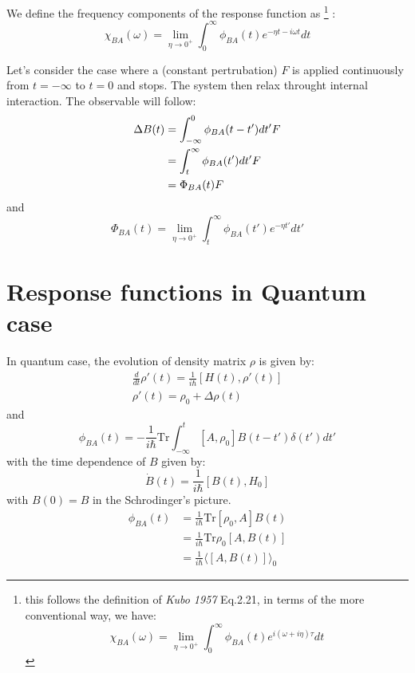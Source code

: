 \documentclass{article}
\begin{document}
We define the frequency components of the response function as
\footnote{this follows the definition of \emph{Kubo 1957} Eq.2.21, in terms
of the more conventional way, we have:
\begin{equation}
    \chi_{BA}(\omega) = \lim_{\eta\to 0^+} \int_{0}^{\infty} \phi_{BA} (t) e^{i(\omega+i\eta)\tau} dt
\end{equation}
}
:
\begin{equation}
    \chi_{BA}(\omega) = \lim_{\eta\to 0^+} \int_{0}^{\infty} \phi_{BA} (t) e^{-\eta t-i\omega t} dt
\end{equation}

Let's consider the case where a (constant pertrubation) $F$ is applied continuously from $t = -\infty$ to 
$t = 0$ and stops. The system then relax throught internal interaction. The observable will
follow:
\begin{align}
    \Delta B(t) &= \int_{-\infty}^{0} \phi_{BA} (t-t') dt' F \notag \\
                &= \int_{t}^{\infty} \phi_{BA} (t') dt' F \notag \\
                &= \Phi_{BA} (t) F
\end{align}
and
\begin{equation}
    \Phi_{BA} (t) = \lim_{\eta\to 0^+} \int_{t}^{\infty} \phi_{BA} (t') e^{-\eta t'} dt'
\end{equation}

\section{Response functions in Quantum case}
In quantum case, the evolution of density matrix $\rho$ is given by:
\begin{gather}
    \frac{d}{dt} \rho'(t) = \frac{1}{i\hbar} [ H(t), \rho'(t) ] \\
    \rho'(t) = \rho_0 + \Delta\rho(t)
\end{gather}
and 
\begin{equation}
    \phi_{BA} (t) = - \frac{1}{i\hbar} \text{Tr} \int_{-\infty}^{t} [A, \rho_0] B(t-t') \delta(t') dt'
\end{equation}
with the time dependence of $B$ given by:
\begin{equation}
    \dot{B}(t) = \frac{1}{i\hbar} [B(t), H_0]
\end{equation}
with $B(0) = B$ in the Schrodinger's picture.
\begin{align}
    \phi_{BA} (t) &=\frac{1}{i\hbar} \text{Tr} [\rho_0, A] B(t) \\
                &= \frac{1}{i\hbar} \text{Tr} \rho_0 [A, B(t)] \\
                &= \frac{1}{i\hbar} \langle [A, B(t)] \rangle_0
\end{align}
\end{document}
